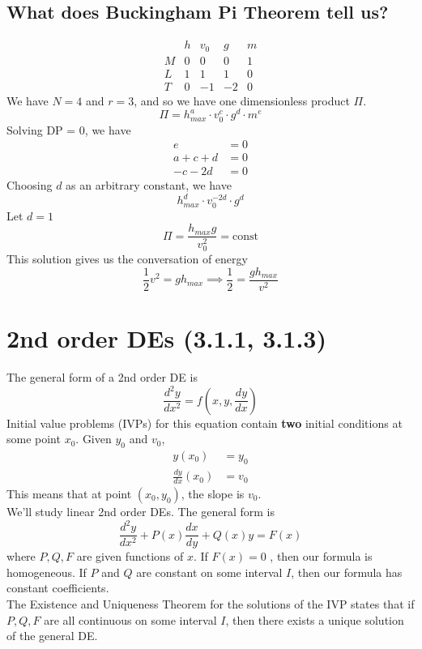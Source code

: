 \documentclass{report}
\begin{document}
\subsection{What does Buckingham Pi Theorem tell us?}
$$\begin{matrix}
& h  & v_0 & g & m  \\
M & 0 & 0 & 0 & 1 \\
L & 1 & 1 & 1 & 0 \\
T & 0 & -1 & -2 & 0
\end{matrix}$$
We have $N = 4$ and $r = 3$, and so we have one dimensionless product $\Pi$.
\begin{equation}
\Pi = h_{max}^a\cdot v_0^c\cdot g^d\cdot m^e
\end{equation}
Solving DP = 0, we have
\begin{align*}
e &= 0 \\
a + c + d &= 0 \\
-c -2d &= 0
\end{align*}
Choosing $d$ as an arbitrary constant, we have
$$h_{max}^d \cdot v_0^{-2d} \cdot g^d$$
Let $d=1$
$$\Pi = \frac{h_{max}g}{v_0^2} = \text{const}$$
This solution gives us the conversation of energy
$$\frac{1}{2}v^2 = gh_{max} \implies \frac{1}{2} = \frac{gh_{max}}{v^2}$$
\section{2nd order DEs (3.1.1, 3.1.3)}
The general form of a 2nd order DE is
$$\frac{d^2y}{dx^2} = f\left(x,y,\frac{dy}{dx}\right)$$
Initial value problems (IVPs) for this equation contain \textbf{two} initial conditions at some point $x_0$. Given $y_0$ and $v_0$,
\begin{align*}
y(x_0) &= y_0 \\
\frac{dy}{dx}(x_0) &= v_0
\end{align*}
This means that at point $(x_0, y_0)$, the slope is $v_0$.\\
We'll study linear 2nd order DEs. The general form is
$$\frac{d^2y}{dx^2} + P(x)\frac{dx}{dy} + Q(x)y = F(x)$$ 
where $P, Q, F$ are given functions of $x$. If $F(x) = 0$ , then our formula is homogeneous. If $P$ and $Q$ are constant on some interval $I$, then our formula has constant coefficients. \\
The Existence and Uniqueness Theorem for the solutions of the IVP states that if $P,Q, F$ are all continuous on some interval $I$, then there exists a unique solution of the general DE.
\end{document}
